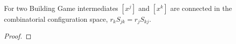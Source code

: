 \begin{mythm}
\label{thm:rSrS}
For two Building Game intermediates $[x^j]$ and $[x^k]$ are connected in the combinatorial configuration space, $r_kS_{jk} = r_jS_{kj}$.
\end{mythm}
\begin{proof}

%



\end{proof}
